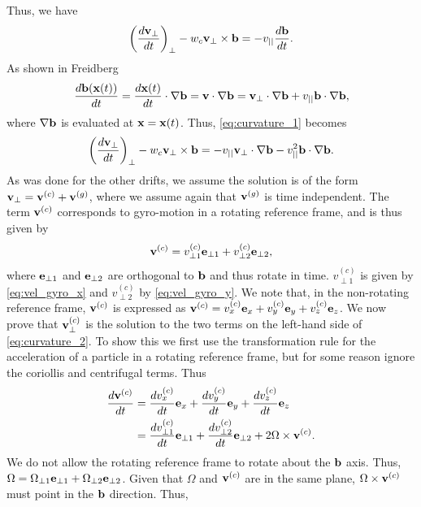 \documentclass[a4paper,11pt]{report}
\begin{document}
Thus, we have
\begin{equation}
\label{eq:curvature_1}
    \left ( \frac{ d \mathbf{v}_\perp}{dt} \right )_\perp - w_c \mathbf{v}_\perp \times \mathbf{b} = -v_{||} \frac{d\mathbf{b}}{dt}.
\end{equation}
As shown in Freidberg
\begin{equation}
    \frac{d \mathbf{b}(\mathbf{x}(t))}{dt} = \frac{d \mathbf{x}(t)}{dt} \cdot \nabla \mathbf{b} = \mathbf{v} \cdot \nabla \mathbf{b} = \mathbf{v}_\perp \cdot \nabla \mathbf{b} + v_{||} \mathbf{b} \cdot \nabla \mathbf{b},
\end{equation}
where $\nabla \mathbf{b}$ is evaluated at $\mathbf{x} = \mathbf{x}(t)$. Thus, \cref{eq:curvature_1} becomes
\begin{equation}
\label{eq:curvature_2}
    \left ( \frac{ d \mathbf{v}_\perp}{dt} \right )_\perp - w_c \mathbf{v}_\perp \times \mathbf{b} = -v_{||} \mathbf{v}_\perp \cdot \nabla \mathbf{b} - v_{||}^2 \mathbf{b} \cdot \nabla \mathbf{b}.
\end{equation}
As was done for the other drifts, we assume the solution is of the form $\mathbf{v}_\perp = \mathbf{v}^{(c)} + \mathbf{v}^{(g)}$, where we assume again that $\mathbf{v}^{(g)}$ is time independent. The term $\mathbf{v}^{(c)}$ corresponds to gyro-motion in a rotating reference frame, and is thus given by 
\begin{equation}
    \mathbf{v}^{(c)} = v^{(c)}_{\perp1} \mathbf{e}_{\perp1} + v^{(c)}_{\perp2} \mathbf{e}_{\perp2},
\end{equation}
where $\mathbf{e}_{\perp1}$ and $\mathbf{e}_{\perp2}$ are orthogonal to $\mathbf{b}$ and thus rotate in time. $v^{(c)}_{\perp1}$ is given by \cref{eq:vel_gyro_x} and $v^{(c)}_{\perp2}$ by \cref{eq:vel_gyro_y}. We note that, in the non-rotating reference frame, $\mathbf{v}^{(c)}$ is expressed as $\mathbf{v}^{(c)} = v^{(c)}_x \mathbf{e}_x + v^{(c)}_y \mathbf{e}_y + v^{(c)}_z \mathbf{e}_z$. We now prove that $\mathbf{v}_\perp^{(c)}$ is the solution to the two terms on the left-hand side of \cref{eq:curvature_2}. To show this we first use the transformation rule for the acceleration of a particle in a rotating reference frame, but for some reason ignore the coriollis and centrifugal terms. Thus
\begin{align}
    \frac{d \mathbf{v}^{(c)}}{dt} &= \frac{dv^{(c)}_x}{dt} \mathbf{e}_x + \frac{dv^{(c)}_y}{dt} \mathbf{e}_y + \frac{dv^{(c)}_z}{dt} \mathbf{e}_z \nonumber \\ &= \frac{dv^{(c)}_{\perp1}}{dt} \mathbf{e}_{\perp1} + \frac{dv^{(c)}_{\perp2}}{dt} \mathbf{e}_{\perp2} + 2\Omega \times \mathbf{v}^{(c)}.
\end{align}
We do not allow the rotating reference frame to rotate about the $\mathbf{b}$ axis. Thus, $\Omega = \Omega_{\perp1} \mathbf{e}_{\perp1} + \Omega_{\perp2} \mathbf{e}_{\perp2}$. Given that $\Omega$ and $\mathbf{v}^{(c)}$ are in the same plane, $\Omega \times \mathbf{v}^{(c)}$ must point in the $\mathbf{b}$ direction. Thus, 
\end{document}
